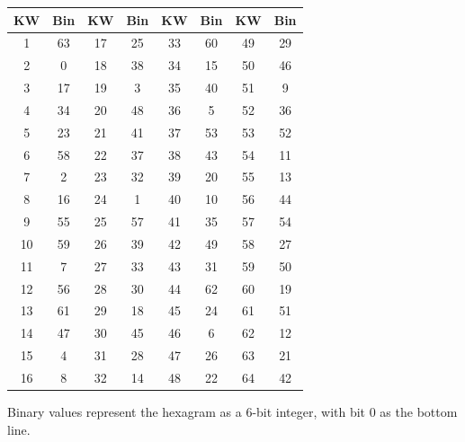 \documentclass[11pt]{article}
\theoremstyle{definition}
\theoremstyle{plain}
\begin{document}
\begin{center}
\small
\begin{tabular}{cc|cc|cc|cc}
\toprule
KW & Bin & KW & Bin & KW & Bin & KW & Bin \\
\midrule
1 & 63 & 17 & 25 & 33 & 60 & 49 & 29 \\
2 & 0 & 18 & 38 & 34 & 15 & 50 & 46 \\
3 & 17 & 19 & 3 & 35 & 40 & 51 & 9 \\
4 & 34 & 20 & 48 & 36 & 5 & 52 & 36 \\
5 & 23 & 21 & 41 & 37 & 53 & 53 & 52 \\
6 & 58 & 22 & 37 & 38 & 43 & 54 & 11 \\
7 & 2 & 23 & 32 & 39 & 20 & 55 & 13 \\
8 & 16 & 24 & 1 & 40 & 10 & 56 & 44 \\
9 & 55 & 25 & 57 & 41 & 35 & 57 & 54 \\
10 & 59 & 26 & 39 & 42 & 49 & 58 & 27 \\
11 & 7 & 27 & 33 & 43 & 31 & 59 & 50 \\
12 & 56 & 28 & 30 & 44 & 62 & 60 & 19 \\
13 & 61 & 29 & 18 & 45 & 24 & 61 & 51 \\
14 & 47 & 30 & 45 & 46 & 6 & 62 & 12 \\
15 & 4 & 31 & 28 & 47 & 26 & 63 & 21 \\
16 & 8 & 32 & 14 & 48 & 22 & 64 & 42 \\
\bottomrule
\end{tabular}
\end{center}

Binary values represent the hexagram as a 6-bit integer, with bit 0 as the bottom line.
\end{document}

